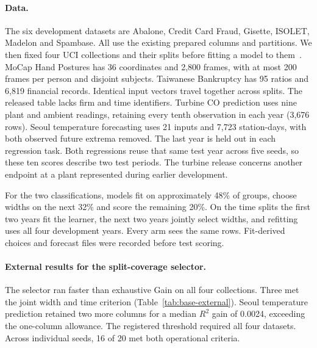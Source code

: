 \paragraph{Data.}
The six development datasets are Abalone, Credit Card Fraud, Gisette, ISOLET, Madelon and Spambase. All use the existing prepared columns and partitions. We then fixed four UCI collections and their splits before fitting a model to them~\citep{uciMoCap,uciBankruptcy,uciTurbine,uciTemperature}. MoCap Hand Postures has 36 coordinates and 2,800 frames, with at most 200 frames per person and disjoint subjects. Taiwanese Bankruptcy has 95 ratios and 6,819 financial records. Identical input vectors travel together across splits. The released table lacks firm and time identifiers. Turbine CO prediction uses nine plant and ambient readings, retaining every tenth observation in each year (3,676 rows). Seoul temperature forecasting uses 21 inputs and 7,723 station-days, with both observed future extrema removed. The last year is held out in each regression task. Both regressions reuse that same test year across five seeds, so these ten scores describe two test periods. The turbine release concerns another endpoint at a plant represented during earlier development.

For the two classifications, models fit on approximately 48\% of groups, choose widths on the next 32\% and score the remaining 20\%. On the time splits the first two years fit the learner, the next two years jointly select widths, and refitting uses all four development years. Every arm sees the same rows. Fit-derived choices and forecast files were recorded before test scoring.

\paragraph{External results for the split-coverage selector.}
The selector ran faster than exhaustive Gain on all four collections. Three met the joint width and time criterion (Table~\ref{tab:base-external}). Seoul temperature prediction retained two more columns for a median $R^2$ gain of 0.0024, exceeding the one-column allowance. The registered threshold required all four datasets. Across individual seeds, 16 of 20 met both operational criteria.

